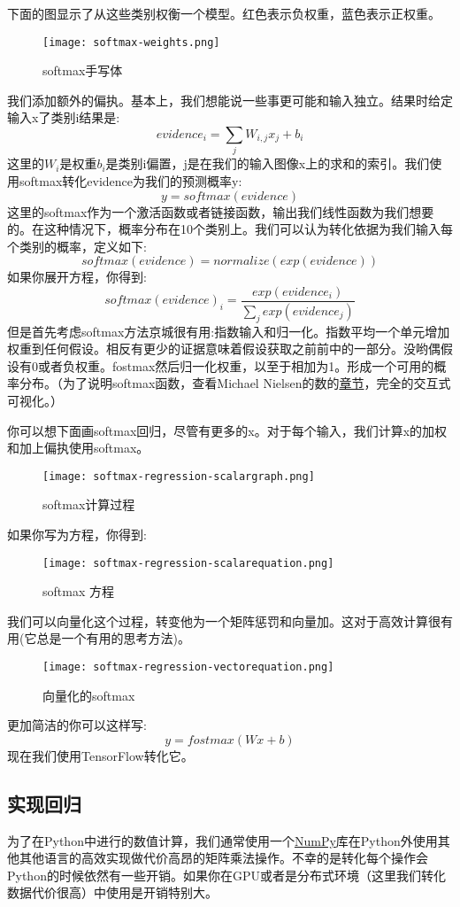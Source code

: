 下面的图显示了从这些类别权衡一个模型。红色表示负权重，蓝色表示正权重。

\begin{figure}[H]
\centering
\texttt{[image: softmax-weights.png]}
\caption{softmax手写体}
\end{figure}
我们添加额外的偏执。基本上，我们想能说一些事更可能和输入独立。结果时给定输入x了类别i结果是:
\[evidence_i = \sum_{j}W_{i,j}x_j+b_i\]
这里的$W_i$是权重$b_i$是类别i偏置，j是在我们的输入图像x上的求和的索引。我们使用softmax转化evidence为我们的预测概率y:
\[y=softmax(evidence)\]
这里的softmax作为一个激活函数或者链接函数，输出我们线性函数为我们想要的。在这种情况下，概率分布在10个类别上。我们可以认为转化依据为我们输入每个类别的概率，定义如下:
\[softmax(evidence)=normalize(exp(evidence))\]
如果你展开方程，你得到:
\[softmax(evidence)_i = \frac{exp(evidence_i)}{\sum_jexp(evidence_j)}\]
但是首先考虑softmax方法京城很有用:指数输入和归一化。指数平均一个单元增加权重到任何假设。相反有更少的证据意味着假设获取之前前中的一部分。没哟偶假设有0或者负权重。fostmax然后归一化权重，以至于相加为1。形成一个可用的概率分布。（为了说明softmax函数，查看Michael Nielsen的数的\href{http://neuralnetworksanddeeplearning.com/chap3.html#softmax}{章节}，完全的交互式可视化。）

你可以想下面画softmax回归，尽管有更多的x。对于每个输入，我们计算x的加权和加上偏执使用softmax。
\begin{figure}[H]
\centering
\texttt{[image: softmax-regression-scalargraph.png]}
\caption{softmax计算过程}
\end{figure}
如果你写为方程，你得到:
\begin{figure}[H]
\centering
\texttt{[image: softmax-regression-scalarequation.png]}
\caption{softmax 方程}
\end{figure}
我们可以向量化这个过程，转变他为一个矩阵惩罚和向量加。这对于高效计算很有用(它总是一个有用的思考方法)。
\begin{figure}[H]
\centering
\texttt{[image: softmax-regression-vectorequation.png]}
\caption{向量化的softmax}
\end{figure}
更加简洁的你可以这样写:
\[y=fostmax(Wx+b)\]
现在我们使用TensorFlow转化它。
\subsection{实现回归}
为了在Python中进行的数值计算，我们通常使用一个\href{http://www.numpy.org/}{NumPy}库在Python外使用其他其他语言的高效实现做代价高昂的矩阵乘法操作。不幸的是转化每个操作会Python的时候依然有一些开销。如果你在GPU或者是分布式环境（这里我们转化数据代价很高）中使用是开销特别大。

